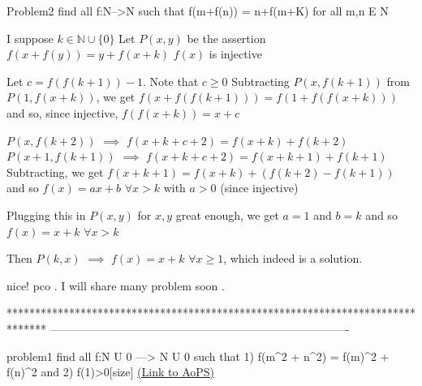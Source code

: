 \begin{solution}
	\begin{tcolorbox}Problem2 find all f:N-->N such that f(m+f(n)) = n+f(m+K) for all m,n E N \end{tcolorbox}
I suppose $k\in\mathbb N\cup\{0\}$
Let $P(x,y)$ be the assertion $f(x+f(y))=y+f(x+k)$
$f(x)$ is injective

Let $c=f(f(k+1))-1$. Note that $c\ge 0$
Subtracting $P(x,f(k+1))$ from $P(1,f(x+k))$, we get $f(x+f(f(k+1)))=f(1+f(f(x+k)))$ and so, since injective, $f(f(x+k))=x+c$

$P(x,f(k+2))$ $\implies$ $f(x+k+c+2)=f(x+k)+f(k+2)$
$P(x+1,f(k+1))$ $\implies$ $f(x+k+c+2)=f(x+k+1)+f(k+1)$
Subtracting, we get $f(x+k+1)=f(x+k)+(f(k+2)-f(k+1))$ and so $f(x)=ax+b$ $\forall x>k$ with $a>0$ (since injective)

Plugging this in $P(x,y)$ for $x,y$ great enough, we get $a=1$ and $b=k$ and so $f(x)=x+k$ $\forall x>k$

Then $P(k,x)$ $\implies$ $\boxed{f(x)=x+k}$ $\forall x\ge 1$, which indeed is a solution.
\end{solution}



\begin{solution}
	nice! pco . I will share many problem soon .
\end{solution}
*******************************************************************************
-------------------------------------------------------------------------------

\begin{problem}problem1 find all f:N U {0} ---> N U {0}  such that 1) f(m^2 + n^2) = {f(m)}^2 + {f(n)}^2  and 2) f(1)>0[\/size]
	\flushright \href{https://artofproblemsolving.com/community/c6h575184}{(Link to AoPS)}
\end{problem}



